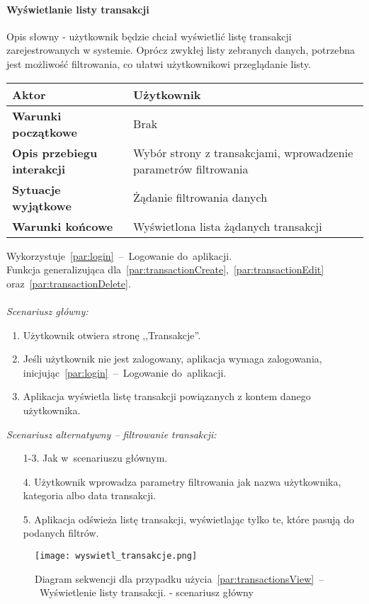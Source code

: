 \paragraph{Wyświetlanie listy transakcji\newline}
Opis słowny - użytkownik będzie chciał wyświetlić listę transakcji zarejestrowanych w systemie.
Oprócz zwykłej listy zebranych danych, potrzebna jest możliwość filtrowania, co ułatwi użytkownikowi
przeglądanie listy.
\begin{longtable}{|p{5cm}|p{7cm}|}
 	\hline
	\textbf{Aktor} & Użytkownik \\
	\hline
	\textbf{Warunki początkowe} & Brak
	\\
	\hline
	\textbf{Opis przebiegu interakcji} & Wybór strony z transakcjami,
	wprowadzenie parametrów filtrowania
	\\
	\hline
	\textbf{Sytuacje wyjątkowe} & Żądanie filtrowania danych
	\\
	\hline
	\textbf{Warunki końcowe} & Wyświetlona lista żądanych transakcji
	\\
	\hline
 \end{longtable}
Wykorzystuje~\ref{par:login}~--~Logowanie do~aplikacji.\\
\indent Funkcja generalizująca dla~\ref{par:transactionCreate},~\ref{par:transactionEdit} oraz~\ref{par:transactionDelete}.\\\\
\textit{Scenariusz główny:}
\begin{enumerate}
  \item Użytkownik otwiera stronę ,,Transakcje''.
  \item Jeśli użytkownik nie jest zalogowany, aplikacja wymaga zalogowania, inicjując~\ref{par:login}~--~Logowanie do~aplikacji.
  \item Aplikacja wyświetla listę transakcji powiązanych z kontem danego użytkownika.
\end{enumerate}
\textit{Scenariusz alternatywny -- filtrowanie transakcji:}
\begin{enumerate}
  \item[1-3.] Jak w~scenariuszu głównym.
  \item[4.] Użytkownik wprowadza parametry filtrowania jak nazwa użytkownika, kategoria albo data transakcji.
  \item[5.] Aplikacja odświeża listę transakcji, wyświetlając tylko te, które pasują do podanych filtrów.
\end{enumerate}

\begin{figure}[H]
    \texttt{[image: wyswietl\_transakcje.png]}
    \caption{Diagram sekwencji dla przypadku użycia~\ref{par:transactionsView}~--~Wyświetlenie listy transakcji.
    - scenariusz główny}
\end{figure}

